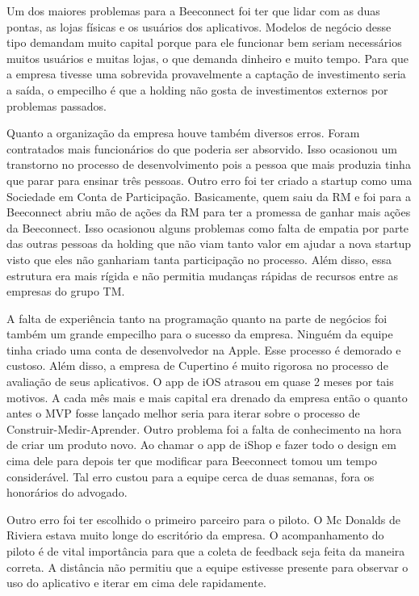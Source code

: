 Um dos maiores problemas para a Beeconnect foi ter que lidar com as duas pontas, as lojas físicas e os usuários dos aplicativos. Modelos de negócio desse tipo demandam muito capital porque para ele funcionar bem seriam necessários muitos usuários e muitas lojas, o que demanda dinheiro e muito tempo. Para que a empresa tivesse uma sobrevida provavelmente a captação de investimento seria a saída, o empecilho é que a holding não gosta de investimentos externos por problemas passados.

Quanto a organização da empresa houve também diversos erros. Foram contratados mais funcionários do que poderia ser absorvido. Isso ocasionou um transtorno no processo de desenvolvimento pois a pessoa que mais produzia tinha que parar para ensinar três pessoas. Outro erro foi ter criado a startup como uma Sociedade em Conta de Participação. Basicamente, quem saiu da RM e foi para a Beeconnect abriu mão de ações da RM para ter a promessa de ganhar mais ações da Beeconnect. Isso ocasionou alguns problemas como falta de empatia por parte das outras pessoas da holding que não viam tanto valor em ajudar a nova startup visto que eles não ganhariam tanta participação no processo. Além disso, essa estrutura era mais rígida e não permitia mudanças rápidas de recursos entre as empresas do grupo TM.

A falta de experiência tanto na programação quanto na parte de negócios foi também um grande empecilho para o sucesso da empresa. Ninguém da equipe tinha criado uma conta de desenvolvedor na Apple. Esse processo é demorado e custoso. Além disso, a empresa de Cupertino é muito rigorosa no processo de avaliação de seus aplicativos. O app de iOS atrasou em quase 2 meses por tais motivos. A cada mês mais e mais capital era drenado da empresa então o quanto antes o MVP fosse lançado melhor seria para iterar sobre o processo de Construir-Medir-Aprender. Outro problema foi a falta de conhecimento na hora de criar um produto novo. Ao chamar o app de iShop e fazer todo o design em cima dele para depois ter que modificar para Beeconnect tomou um tempo considerável. Tal erro custou para a equipe cerca de duas semanas, fora os honorários do advogado.

Outro erro foi ter escolhido o primeiro parceiro para o piloto. O Mc Donalds de Riviera estava muito longe do escritório da empresa. O acompanhamento do piloto é de vital importância para que a coleta de feedback seja feita da maneira correta. A distância não permitiu que a equipe estivesse presente para observar o uso do aplicativo e iterar em cima dele rapidamente.

